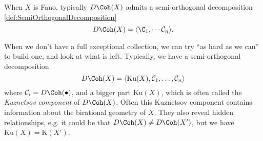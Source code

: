 





    When $X$ is Fano, typically $D\Coh(X)$ admits a semi-orthogonal decomposition \cref{def:SemiOrthogonalDecomposition}
    \[D\Coh(X) = \langle \C_1, \cdots \mathcal C_n\rangle.\]  





When we don't have a full exceptional collection, we can try ``as hard as we can'' to build one, and look at what is left. Typically, we have a semi-orthogonal decomposition 
\[D\Coh(X) = \langle \text{Ku}(X), \mathcal C_1, \ldots, \mathcal C_n\rangle\]
where $\mathcal C_i = D\Coh(\bullet)$, and a bigger part $\text{Ku}(X)$, which is often called the \emph{Kuznetsov component} of $D\Coh(X)$. 
Often this Kuznetsov component contains information about the birational geometry of $X$. They also reveal hidden relationships, e.g. it could be that $D\Coh(X)\neq D\Coh(X')$, but we have $\text{Ku}(X) = \text{K}(X')$. 


